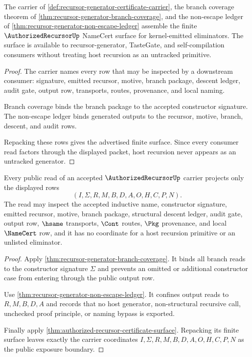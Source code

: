 \begin{theorem}
\label{thm:authorized-recursor-certificate-surface}
The carrier of \autoref{def:recursor-generator-certificate-carrier}, the branch coverage theorem of \autoref{thm:recursor-generator-branch-coverage}, and the non-escape ledger of \autoref{thm:recursor-generator-non-escape-ledger} assemble the finite $\AuthorizedRecursorUp$ NameCert surface for kernel-emitted eliminators. The surface is available to recursor-generator, TasteGate, and self-compilation consumers without treating host recursion as an untracked primitive.
\end{theorem}
\begin{proof}
The carrier names every row that may be inspected by a downstream consumer: signature, emitted recursor, motive, branch package, descent ledger, audit gate, output row, transports, routes, provenance, and local naming.

Branch coverage binds the branch package to the accepted constructor signature. The non-escape ledger binds generated outputs to the recursor, motive, branch, descent, and audit rows.

Repacking these rows gives the advertised finite \NameCert{} surface. Since every consumer read factors through the displayed packet, host recursion never appears as an untracked generator.
\end{proof}

\begin{theorem}
\label{thm:authorized-recursor-carrier-exposure}
Every public read of an accepted $\AuthorizedRecursorUp$ carrier projects only the displayed rows
$$
(I,\Sigma,R,M,B,D,A,O,H,C,P,N).
$$
The read may inspect the accepted inductive name, constructor signature, emitted recursor, motive, branch package, structural descent ledger, audit gate, output row, $\hsame$ transports, $\Cont$ routes, $\Pkg$ provenance, and local $\NameCert$ row, and it has no coordinate for a host recursion primitive or an unlisted eliminator.
\end{theorem}
\begin{proof}
Apply \autoref{thm:recursor-generator-branch-coverage}. It binds all branch reads to the constructor signature $\Sigma$ and prevents an omitted or additional constructor case from entering through the public output row.

Use \autoref{thm:recursor-generator-non-escape-ledger}. It confines output reads to $R,M,B,D,A$ and records that no host generator, non-structural recursive call, unchecked proof principle, or naming bypass is exported.

Finally apply \autoref{thm:authorized-recursor-certificate-surface}. Repacking its finite \NameCert{} surface leaves exactly the carrier coordinates $I,\Sigma,R,M,B,D,A,O,H,C,P,N$ as the public exposure boundary.
\end{proof}


